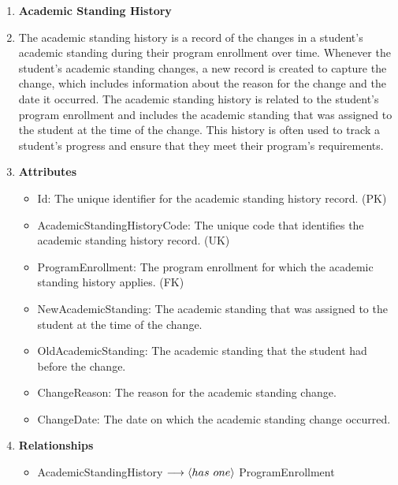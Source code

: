 \documentclass[12pt]{article}
\begin{document}
\begin{appendices}
\begin{enumerate}[label=(\roman*)]
    \item \textbf{Academic Standing History}
    \item[] The academic standing history is a record of the changes in a student's academic standing during their program enrollment over time. Whenever the student's academic standing changes, a new record is created to capture the change, which includes information about the reason for the change and the date it occurred. The academic standing history is related to the student's program enrollment and includes the academic standing that was assigned to the student at the time of the change. This history is often used to track a student's progress and ensure that they meet their program's requirements.
    \item[] \textbf{Attributes}
    \begin{itemize}
        \item Id: The unique identifier for the academic standing history record. (PK)
        \item AcademicStandingHistoryCode: The unique code that identifies the academic standing history record. (UK)
        \item ProgramEnrollment: The program enrollment for which the academic standing history applies. (FK)
        \item NewAcademicStanding: The academic standing that was assigned to the student at the time of the change.
        \item OldAcademicStanding: The academic standing that the student had before the change.
        \item ChangeReason: The reason for the academic standing change.
        \item ChangeDate: The date on which the academic standing change occurred.
    \end{itemize}
    \item[] \textbf{Relationships}
    \begin{itemize}
        \item AcademicStandingHistory $ \longrightarrow \langle has \hspace{0.125cm} one \rangle $ ProgramEnrollment
    \end{itemize}


\end{enumerate}
\end{appendices}
\end{document}
